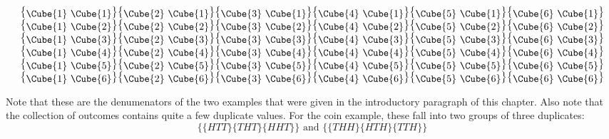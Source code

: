 \[
\begin{array}{c}
\mbox{ \big\{\raisebox{-2pt}{\Cube{1}
    \Cube{1}}\big\}\big\{\raisebox{-2pt}{\Cube{2}
    \Cube{1}}\big\}\big\{\raisebox{-2pt}{\Cube{3}
    \Cube{1}}\big\}\big\{\raisebox{-2pt}{\Cube{4}
    \Cube{1}}\big\}\big\{\raisebox{-2pt}{\Cube{5}
    \Cube{1}}\big\}\big\{\raisebox{-2pt}{\Cube{6} \Cube{1}}\big\}
}\\ \mbox{ \big\{\raisebox{-2pt}{\Cube{1}
    \Cube{2}}\big\}\big\{\raisebox{-2pt}{\Cube{2}
    \Cube{2}}\big\}\big\{\raisebox{-2pt}{\Cube{3}
    \Cube{2}}\big\}\big\{\raisebox{-2pt}{\Cube{4}
    \Cube{2}}\big\}\big\{\raisebox{-2pt}{\Cube{5}
    \Cube{2}}\big\}\big\{\raisebox{-2pt}{\Cube{6} \Cube{2}}\big\}
}\\ \mbox{ \big\{\raisebox{-2pt}{\Cube{1}
    \Cube{3}}\big\}\big\{\raisebox{-2pt}{\Cube{2}
    \Cube{3}}\big\}\big\{\raisebox{-2pt}{\Cube{3}
    \Cube{3}}\big\}\big\{\raisebox{-2pt}{\Cube{4}
    \Cube{3}}\big\}\big\{\raisebox{-2pt}{\Cube{5}
    \Cube{3}}\big\}\big\{\raisebox{-2pt}{\Cube{6} \Cube{3}}\big\}
}\\ \mbox{ \big\{\raisebox{-2pt}{\Cube{1}
    \Cube{4}}\big\}\big\{\raisebox{-2pt}{\Cube{2}
    \Cube{4}}\big\}\big\{\raisebox{-2pt}{\Cube{3}
    \Cube{4}}\big\}\big\{\raisebox{-2pt}{\Cube{4}
    \Cube{4}}\big\}\big\{\raisebox{-2pt}{\Cube{5}
    \Cube{4}}\big\}\big\{\raisebox{-2pt}{\Cube{6} \Cube{4}}\big\}
}\\ \mbox{ \big\{\raisebox{-2pt}{\Cube{1}
    \Cube{5}}\big\}\big\{\raisebox{-2pt}{\Cube{2}
    \Cube{5}}\big\}\big\{\raisebox{-2pt}{\Cube{3}
    \Cube{5}}\big\}\big\{\raisebox{-2pt}{\Cube{4}
    \Cube{5}}\big\}\big\{\raisebox{-2pt}{\Cube{5}
    \Cube{5}}\big\}\big\{\raisebox{-2pt}{\Cube{6} \Cube{5}}\big\}
}\\ \mbox{ \big\{\raisebox{-2pt}{\Cube{1}
    \Cube{6}}\big\}\big\{\raisebox{-2pt}{\Cube{2}
    \Cube{6}}\big\}\big\{\raisebox{-2pt}{\Cube{3}
    \Cube{6}}\big\}\big\{\raisebox{-2pt}{\Cube{4}
    \Cube{6}}\big\}\big\{\raisebox{-2pt}{\Cube{5}
    \Cube{6}}\big\}\big\{\raisebox{-2pt}{\Cube{6} \Cube{6}}\big\}
}
\end{array}\]
    
Note that these are the denumenators of the two examples that were
given in the introductory paragraph of this chapter. Also note that
the collection of outcomes contains quite a few duplicate values.  For
the coin example, these fall into two groups of three duplicates:
\[\{\{HTT\}\{THT\}\{HHT\}\} \mbox{~and~} \{\{THH\}\{HTH\}\{TTH\}\}\]

